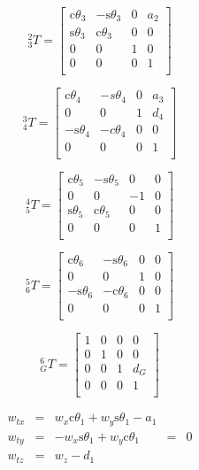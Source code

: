 \documentclass[twoside]{article}
\renewcommand{\c}{\text{c}}
\newcommand{\s}{\text{s}}
\newcommand{\T}[2]{\mbox{$_{#2}^{#1}{T}$}}
\begin{document}
$$ \T{2}{3} =
\begin{bmatrix}
  \c\theta_3 & -\s\theta_3 & 0 & a_2 \\
  \s\theta_3 &  \c\theta_3 & 0 &   0 \\
           0 &           0 & 1 &   0 \\
           0 &           0 & 0 &   1 \\
\end{bmatrix}
$$

$$ \T{3}{4} =
\begin{bmatrix}
  \c\theta_4 & -s\theta_4 & 0 & a_3 \\
           0 &          0 & 1 & d_4 \\
 -\s\theta_4 & -c\theta_4 & 0 &   0 \\
           0 &           0 & 0 &  1 \\
\end{bmatrix}
$$


$$ \T{4}{5} =
\begin{bmatrix}
  \c\theta_5 & -\s\theta_5 &  0 & 0 \\
           0 &           0 & -1 & 0 \\
  \s\theta_5 &  \c\theta_5 &  0 & 0 \\
           0 &           0 &  0 & 1 \\
\end{bmatrix}
$$

$$ \T{5}{6} =
\begin{bmatrix}
  \c\theta_6 & -\s\theta_6 & 0 & 0 \\
           0 &           0 & 1 & 0 \\
 -\s\theta_6 & -\c\theta_6 & 0 & 0 \\
           0 &           0 & 0 & 1 \\
\end{bmatrix}
$$

$$ \T{6}{G} =
\begin{bmatrix}
  1 & 0 & 0 &   0 \\
  0 & 1 & 0 &   0 \\
  0 & 0 & 1 & d_G \\
  0 & 0 & 0 &   1 \\
\end{bmatrix}
$$

$$
\begin{matrix}
  w_{tx} & = & w_x \c\theta_1 + w_y \s\theta_1 - a_1 & &\\
  w_{ty} & = & - w_x  \s\theta_1 + w_y \c\theta_1 & = &0\\
  w_{tz} & = & w_z - d_1&& \\
\end{matrix}
$$
\end{document}
